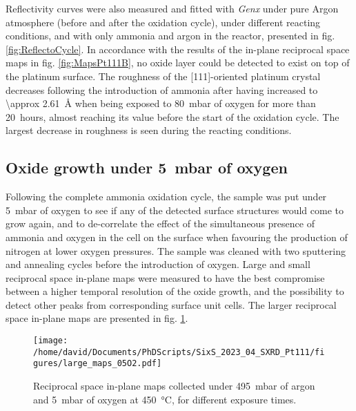 Reflectivity curves were also measured and fitted with \textit{Genx} under pure Argon atmosphere (before and after the oxidation cycle), under different reacting conditions, and with only ammonia and argon in the reactor, presented in fig. \ref{fig:ReflectoCycle}.
In accordance with the results of the in-plane reciprocal space maps in fig. \ref{fig:MapsPt111B}, no oxide layer could be detected to exist on top of the platinum surface.
The roughness of the [111]-oriented platinum crystal decreases following the introduction of ammonia after having increased to \qty{\approx 2.61}{\angstrom} when being exposed to \qty{80}{\milli\bar} of oxygen for more than \qty{20}{hours}, almost reaching its value before the start of the oxidation cycle.
The largest decrease in roughness is seen during the reacting conditions.

\subsection{Oxide growth under \qty{5}{\milli\bar} of oxygen}

Following the complete ammonia oxidation cycle, the sample was put under \qty{5}{\milli\bar} of oxygen to see if any of the detected surface structures would come to grow again, and to de-correlate the effect of the simultaneous presence of ammonia and oxygen in the cell on the surface when favouring the production of nitrogen at lower oxygen pressures.
The sample was cleaned with two sputtering and annealing cycles before the introduction of oxygen.
Large and small reciprocal space in-plane maps were measured to have the best compromise between a higher temporal resolution of the oxide growth, and the possibility to detect other peaks from corresponding surface unit cells.
The larger reciprocal space in-plane maps are presented in fig. \ref{fig:LargeMapsPt111LowOxygen}.

\begin{figure}[!htb]
    \centering
    \texttt{[image: /home/david/Documents/PhDScripts/SixS\_2023\_04\_SXRD\_Pt111/figures/large\_maps\_05O2.pdf]}
    \caption{
        Reciprocal space in-plane maps collected under \qty{495}{\milli\bar} of argon and \qty{5}{\milli\bar} of oxygen at \qty{450}{\degreeCelsius}, for different exposure times.
    }
    \label{fig:LargeMapsPt111LowOxygen}
\end{figure}

